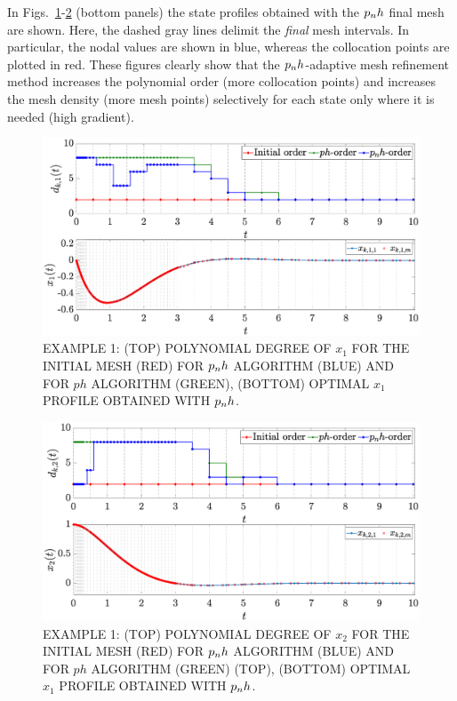 In Figs.~\ref{fig:pnh1vanderpol}-\ref{fig:pnh2vanderpol} (bottom panels) the state profiles obtained with the $p_{n}h$ final mesh are shown. Here, the dashed gray lines delimit the \emph{final} mesh intervals. In particular, the nodal values are shown in blue, whereas the collocation points are plotted in red. These figures clearly show that the $p_{n}h$-adaptive mesh refinement method increases the polynomial order (more collocation points) and increases the mesh density (more mesh points) selectively for each state only where it is needed (high gradient).
\begin{figure}[t]
	\centering
	\includegraphics[trim={1cm 0cm 2cm 0cm},clip,width=1\columnwidth]{Img/pnh1_vanderpol1}
	\caption{EXAMPLE 1:  (TOP) POLYNOMIAL DEGREE OF $x_{1}$ FOR THE INITIAL MESH (RED) FOR $p_{n}h$ ALGORITHM (BLUE) AND FOR $ph$ ALGORITHM (GREEN), (BOTTOM)
	OPTIMAL $x_1$ PROFILE OBTAINED WITH $p_{n}h$.}
	\label{fig:pnh1vanderpol}
\end{figure}
\begin{figure}[t]
	\centering
	\includegraphics[trim={1cm 0cm 2cm 0cm},clip,width=1\columnwidth]{Img/pnh2_vanderpol2}
	\caption{EXAMPLE 1: (TOP) POLYNOMIAL DEGREE OF $x_{2}$ FOR THE INITIAL MESH (RED) FOR $p_{n}h$ ALGORITHM (BLUE) AND FOR $ph$ ALGORITHM (GREEN) (TOP), (BOTTOM)
	OPTIMAL $x_1$ PROFILE OBTAINED WITH  $p_{n}h$.}
	\label{fig:pnh2vanderpol}
\end{figure}

